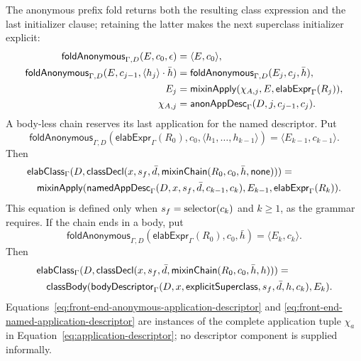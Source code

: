The anonymous prefix fold returns both the resulting class expression and the
last initializer clause; retaining the latter makes the next superclass
initializer explicit:
\begin{equation}\label{eq:front-end-mixin-fold}
\begin{aligned}
 \mathsf{foldAnonymous}_{\Gamma,D}(E,c_0,\epsilon)&=\langle E,c_0\rangle,\\
 \mathsf{foldAnonymous}_{\Gamma,D}
  (E,c_{j-1},\langle h_j\rangle\cdot\bar h)
   &=\mathsf{foldAnonymous}_{\Gamma,D}(E_j,c_j,\bar h),\\
 E_j&=\mathsf{mixinApply}(\chi_{A,j},E,
       \mathsf{elabExpr}_{\Gamma}(R_j)),\\
 \chi_{A,j}&=\mathsf{anonAppDesc}_{\Gamma}(D,j,c_{j-1},c_j).
\end{aligned}
\end{equation}
A body-less chain reserves its last application for the named descriptor.  Put
\begin{equation}\label{eq:front-end-bodyless-prefix}
 \mathsf{foldAnonymous}_{\Gamma,D}
  (\mathsf{elabExpr}_{\Gamma}(R_0),c_0,
   \langle h_1,\ldots,h_{k-1}\rangle)
   =\langle E_{k-1},c_{k-1}\rangle.
\end{equation}
Then
\begin{equation}\label{eq:front-end-bodyless-mixin-elaboration}
\begin{aligned}
 &\mathsf{elabClass}_{\Gamma}
  (D,\mathsf{classDecl}(x,s_f,\bar d,
     \mathsf{mixinChain}(R_0,c_0,\bar h,\mathsf{none})))={}\\
 &\quad\mathsf{mixinApply}(
   \mathsf{namedAppDesc}_{\Gamma}
      (D,x,s_f,\bar d,c_{k-1},c_k),
   E_{k-1},\mathsf{elabExpr}_{\Gamma}(R_k)).
\end{aligned}
\end{equation}
This equation is defined only when $s_f=\mathop{\mathrm{selector}}(c_k)$ and $k\ge1$, as the
grammar requires.  If the chain ends in a body, put
\begin{equation}\label{eq:front-end-bodied-prefix}
 \mathsf{foldAnonymous}_{\Gamma,D}
  (\mathsf{elabExpr}_{\Gamma}(R_0),c_0,\bar h)=\langle E_k,c_k\rangle.
\end{equation}
Then
\begin{equation}\label{eq:front-end-bodied-mixin-elaboration}
\begin{aligned}
 &\mathsf{elabClass}_{\Gamma}
  (D,\mathsf{classDecl}(x,s_f,\bar d,
     \mathsf{mixinChain}(R_0,c_0,\bar h,h)))={}\\
 &\quad\mathsf{classBody}
   (\mathsf{bodyDescriptor}_{\Gamma}
      (D,x,\mathsf{explicitSuperclass},s_f,\bar d,h,c_k),E_k).
\end{aligned}
\end{equation}
Equations~\eqref{eq:front-end-anonymous-application-descriptor} and
\eqref{eq:front-end-named-application-descriptor} are instances of the complete
application tuple $\chi_a$ in Equation~\eqref{eq:application-descriptor}; no
descriptor component is supplied informally.

